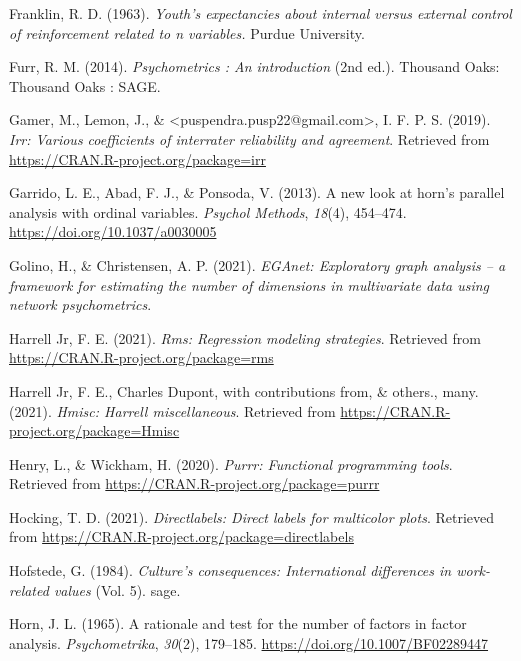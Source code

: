 \documentclass[
  english,
  man]{apa6}
\newlength{\cslhangindent}
\newlength{\cslentryspacingunit} %
\newenvironment{CSLReferences}[2] %
 {%
  \setlength{\parindent}{0pt}
  \ifodd #1
  \let\oldpar\par
  \def\par{\hangindent=\cslhangindent\oldpar}
  \fi
  \setlength{\parskip}{#2\cslentryspacingunit}
 }%
 {}
\begin{document}
\begin{CSLReferences}{1}{0}
\leavevmode{}%
Franklin, R. D. (1963). \emph{Youth's expectancies about internal versus external control of reinforcement related to n variables.} Purdue University.

\leavevmode{}%
Furr, R. M. (2014). \emph{Psychometrics : An introduction} (2nd ed.). Thousand Oaks: Thousand Oaks : SAGE.

\leavevmode{}%
Gamer, M., Lemon, J., \& \textless puspendra.pusp22@gmail.com\textgreater, I. F. P. S. (2019). \emph{Irr: Various coefficients of interrater reliability and agreement}. Retrieved from \url{https://CRAN.R-project.org/package=irr}

\leavevmode{}%
Garrido, L. E., Abad, F. J., \& Ponsoda, V. (2013). A new look at horn's parallel analysis with ordinal variables. \emph{Psychol Methods}, \emph{18}(4), 454--474. \url{https://doi.org/10.1037/a0030005}

\leavevmode{}%
Golino, H., \& Christensen, A. P. (2021). \emph{EGAnet: Exploratory graph analysis -- a framework for estimating the number of dimensions in multivariate data using network psychometrics}.

\leavevmode{}%
Harrell Jr, F. E. (2021). \emph{Rms: Regression modeling strategies}. Retrieved from \url{https://CRAN.R-project.org/package=rms}

\leavevmode{}%
Harrell Jr, F. E., Charles Dupont, with contributions from, \& others., many. (2021). \emph{Hmisc: Harrell miscellaneous}. Retrieved from \url{https://CRAN.R-project.org/package=Hmisc}

\leavevmode{}%
Henry, L., \& Wickham, H. (2020). \emph{Purrr: Functional programming tools}. Retrieved from \url{https://CRAN.R-project.org/package=purrr}

\leavevmode{}%
Hocking, T. D. (2021). \emph{Directlabels: Direct labels for multicolor plots}. Retrieved from \url{https://CRAN.R-project.org/package=directlabels}

\leavevmode{}%
Hofstede, G. (1984). \emph{Culture's consequences: International differences in work-related values} (Vol. 5). sage.

\leavevmode{}%
Horn, J. L. (1965). A rationale and test for the number of factors in factor analysis. \emph{Psychometrika}, \emph{30}(2), 179--185. \url{https://doi.org/10.1007/BF02289447}


\end{CSLReferences}
\end{document}
